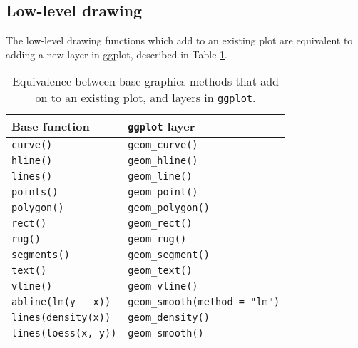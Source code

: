 \subsection{Low-level drawing}

The low-level drawing functions which add to an existing plot are
equivalent to adding a new layer in ggplot, described in Table
\ref{tbl:base-equiv}.

\begin{table}
  \begin{center}
    \begin{tabular}{ll}
      \toprule
      Base function & \texttt{ggplot} layer \\
      \midrule
      \texttt{curve()}    & \texttt{geom\_curve()}      \\
      \texttt{hline()}    & \texttt{geom\_hline()}      \\
      \texttt{lines()}    & \texttt{geom\_line()}       \\
      \texttt{points()}   & \texttt{geom\_point()}      \\
      \texttt{polygon()}  & \texttt{geom\_polygon()}    \\
      \texttt{rect()}     & \texttt{geom\_rect()}       \\
      \texttt{rug()}      & \texttt{geom\_rug()}        \\
      \texttt{segments()} & \texttt{geom\_segment()}    \\
      \texttt{text()}     & \texttt{geom\_text()}       \\
      \texttt{vline()}    & \texttt{geom\_vline()}      \\
      \texttt{abline(lm(y ~ x))}  & \texttt{geom\_smooth(method = "lm")}  \\
      \texttt{lines(density(x))}  & \texttt{geom\_density()}         \\
      \texttt{lines(loess(x, y))} & \texttt{geom\_smooth()}          \\
      \bottomrule
    \end{tabular}
  \end{center}
  \caption{Equivalence between base graphics methods that add on to an existing plot, and layers in \texttt{ggplot}.}
  \label{tbl:base-equiv}
\end{table}

\begin{Shaded}
\begin{Highlighting}[]

\StringTok{ }\NormalTok{()}

\NormalTok{() +}\StringTok{ }\NormalTok{()}
\end{Highlighting}
\end{Shaded}

